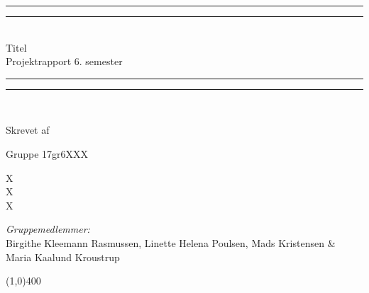 \clearpage
\thispagestyle{empty}




\begin{center}
\vspace*{\baselineskip}
\rule{\textwidth}{1.6pt}\vspace*{-\baselineskip}\vspace*{2pt} %
\rule{\textwidth}{0.4pt}\\[\baselineskip] %

{\huge Titel \\[0.4\baselineskip] \LARGE Projektrapport 6. semester}\\[0.2\baselineskip] %

\rule{\textwidth}{0.4pt}\vspace*{-\baselineskip}\vspace{3.2pt} %
\rule{\textwidth}{1.6pt}\\[\baselineskip] %
\vspace*{3\baselineskip}



Skrevet af \\
{\Large Gruppe 17gr6XXX\par}
\end{center} %
{\color{white}X \\ X \\ X \\}
\begin{figure}[H]
	\centering
	\begin{minipage}[b]{1\textwidth}
	\end{minipage}
	\hfill
\end{figure}

\vspace*{\fill}
\begin{center}
	\textit{Gruppemedlemmer:}\\
	Birgithe Kleemann Rasmussen, Linette Helena Poulsen, Mads Kristensen \& Maria Kaalund Kroustrup \\
\end{center}
\begin{center}
\line(1,0){400}
\end{center}
